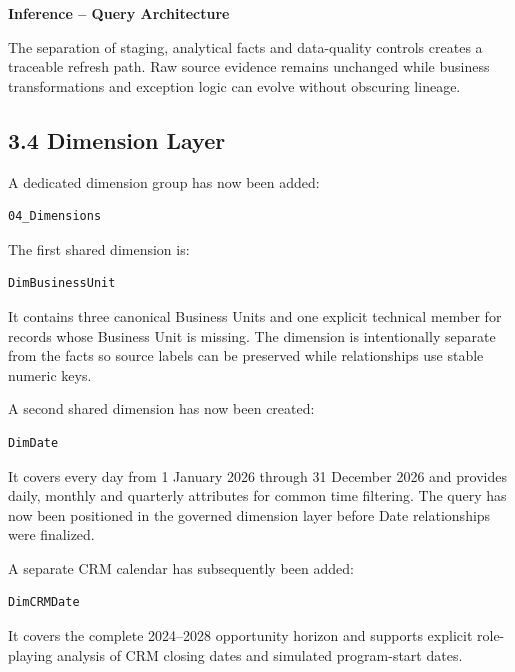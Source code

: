 \documentclass[11pt,a4paper]{article}
\begin{document}
\begin{inferencebox}

\textbf{Inference -- Query Architecture}

The separation of staging, analytical facts and data-quality controls creates
a traceable refresh path. Raw source evidence remains unchanged while business
transformations and exception logic can evolve without obscuring lineage.

\end{inferencebox}

\subsection{3.4 Dimension Layer}

A dedicated dimension group has now been added:

\begin{lstlisting}[style=powerquery]
04_Dimensions
\end{lstlisting}

The first shared dimension is:

\begin{lstlisting}[style=powerquery]
DimBusinessUnit
\end{lstlisting}

It contains three canonical Business Units and one explicit technical member
for records whose Business Unit is missing. The dimension is intentionally
separate from the facts so source labels can be preserved while relationships
use stable numeric keys.

A second shared dimension has now been created:

\begin{lstlisting}[style=powerquery]
DimDate
\end{lstlisting}

It covers every day from 1 January 2026 through 31 December 2026 and provides
daily, monthly and quarterly attributes for common time filtering. The query has
now been positioned in the governed dimension layer before Date relationships
were finalized.

A separate CRM calendar has subsequently been added:

\begin{lstlisting}[style=powerquery]
DimCRMDate
\end{lstlisting}

It covers the complete 2024--2028 opportunity horizon and supports explicit
role-playing analysis of CRM closing dates and simulated program-start dates.
\end{document}
